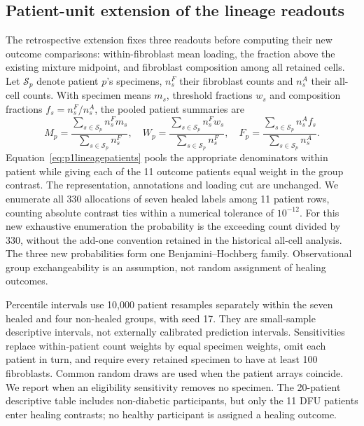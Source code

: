 \subsection{Patient-unit extension of the lineage readouts}
The retrospective extension fixes three readouts before computing their new outcome comparisons: within-fibroblast mean loading, the fraction above the existing mixture midpoint, and fibroblast composition among all retained cells. Let $\mathcal S_p$ denote patient $p$'s specimens, $n_s^F$ their fibroblast counts and $n_s^A$ their all-cell counts. With specimen means $m_s$, threshold fractions $w_s$ and composition fractions $f_s=n_s^F/n_s^A$, the pooled patient summaries are
\begin{equation}
M_p=\frac{\sum_{s\in\mathcal S_p}n_s^F m_s}{\sum_{s\in\mathcal S_p}n_s^F},\quad
W_p=\frac{\sum_{s\in\mathcal S_p}n_s^F w_s}{\sum_{s\in\mathcal S_p}n_s^F},\quad
F_p=\frac{\sum_{s\in\mathcal S_p}n_s^A f_s}{\sum_{s\in\mathcal S_p}n_s^A}.\label{eq:p1lineagepatients}
\end{equation}
Equation~\eqref{eq:p1lineagepatients} pools the appropriate denominators within patient while giving each of the 11 outcome patients equal weight in the group contrast. The representation, annotations and loading cut are unchanged. We enumerate all 330 allocations of seven healed labels among 11 patient rows, counting absolute contrast ties within a numerical tolerance of $10^{-12}$. For this new exhaustive enumeration the probability is the exceeding count divided by 330, without the add-one convention retained in the historical all-cell analysis. The three new probabilities form one Benjamini--Hochberg family. Observational group exchangeability is an assumption, not random assignment of healing outcomes.

Percentile intervals use 10,000 patient resamples separately within the seven healed and four non-healed groups, with seed 17. They are small-sample descriptive intervals, not externally calibrated prediction intervals. Sensitivities replace within-patient count weights by equal specimen weights, omit each patient in turn, and require every retained specimen to have at least 100 fibroblasts. Common random draws are used when the patient arrays coincide. We report when an eligibility sensitivity removes no specimen. The 20-patient descriptive table includes non-diabetic participants, but only the 11 DFU patients enter healing contrasts; no healthy participant is assigned a healing outcome.

